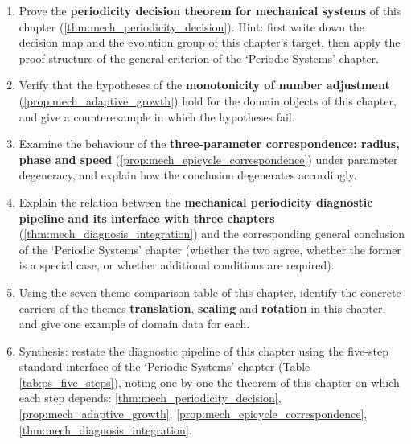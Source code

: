 \begin{enumerate}[leftmargin=3em, label=\textbf{Exercise \arabic*}]
    \item Prove the \textbf{periodicity decision theorem for mechanical systems} of this chapter (\ref{thm:mech_periodicity_decision}). Hint: first write down the decision map and the evolution group of this chapter's target, then apply the proof structure of the general criterion of the `Periodic Systems' chapter.

    \item Verify that the hypotheses of the \textbf{monotonicity of number adjustment} (\ref{prop:mech_adaptive_growth}) hold for the domain objects of this chapter, and give a counterexample in which the hypotheses fail.

    \item Examine the behaviour of the \textbf{three-parameter correspondence: radius, phase and speed} (\ref{prop:mech_epicycle_correspondence}) under parameter degeneracy, and explain how the conclusion degenerates accordingly.

    \item Explain the relation between the \textbf{mechanical periodicity diagnostic pipeline and its interface with three chapters} (\ref{thm:mech_diagnosis_integration}) and the corresponding general conclusion of the `Periodic Systems' chapter (whether the two agree, whether the former is a special case, or whether additional conditions are required).

    \item Using the seven-theme comparison table of this chapter, identify the concrete carriers of the themes \textbf{translation}, \textbf{scaling} and \textbf{rotation} in this chapter, and give one example of domain data for each.

    \item Synthesis: restate the diagnostic pipeline of this chapter using the five-step standard interface of the `Periodic Systems' chapter (Table \ref{tab:ps_five_steps}), noting one by one the theorem of this chapter on which each step depends: \ref{thm:mech_periodicity_decision}, \ref{prop:mech_adaptive_growth}, \ref{prop:mech_epicycle_correspondence}, \ref{thm:mech_diagnosis_integration}.
\end{enumerate}


